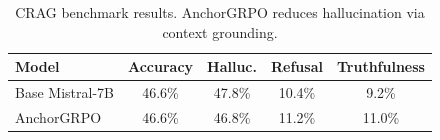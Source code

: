 \begin{table}[t]
\centering
\caption{CRAG benchmark results. AnchorGRPO reduces hallucination via context grounding.}
\label{tab:crag}
\begin{tabular}{lcccc}
\toprule
\textbf{Model} & \textbf{Accuracy} & \textbf{Halluc.} & \textbf{Refusal} & \textbf{Truthfulness} \\
\midrule
    Base Mistral-7B & 46.6\% & 47.8\% & 10.4\% & 9.2\% \\
    AnchorGRPO & 46.6\% & 46.8\% & 11.2\% & 11.0\% \\
\bottomrule
\end{tabular}
\end{table}
